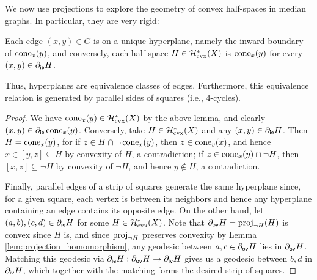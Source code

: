 \documentclass[reqno]{amsart}
\begin{document}
    We now use projections to explore the geometry of convex half-spaces in median graphs. In particular, they are very rigid:

    \begin{proposition}\label{prp:half-spaces_are_cones}
        Each edge $(x,y)\in G$ is on a unique hyperplane, namely the inward boundary of $\operatorname{cone}_x(y)$, and conversely, each half-space $H\in\mathcal{H}^\ast_\mathrm{cvx}(X)$ is $\operatorname{cone}_x(y)$ for every $(x,y)\in\partial_\mathsf{ie}H$.

        Thus, hyperplanes are equivalence classes of edges. Furthermore, this equivalence relation is generated by parallel sides of squares (i.e., $4$-cycles).
    \end{proposition}
    \begin{proof}
        We have $\operatorname{cone}_x(y)\in\mathcal{H}_\mathrm{cvx}^\ast(X)$ by the above lemma, and clearly $(x,y)\in\partial_\mathsf{ie}\operatorname{cone}_x(y)$. Conversely, take $H\in\mathcal{H}_\mathrm{cvx}^\ast(X)$ and any $(x,y)\in\partial_\mathsf{ie}H$. Then $H=\operatorname{cone}_x(y)$, for if $z\in H\cap\lnot\operatorname{cone}_x(y)$, then $z\in\operatorname{cone}_y(x)$, and hence $x\in[y,z]\subseteq H$ by convexity of $H$, a contradiction; if $z\in\operatorname{cone}_x(y)\cap\lnot H$, then $[x,z]\subseteq\lnot H$ by convexity of $\lnot H$, and hence $y\not\in H$, a contradiction.

        Finally, parallel edges of a strip of squares generate the same hyperplane since, for a given square, each vertex is between its neighbors and hence any hyperplane containing an edge contains its opposite edge. On the other hand, let $(a,b),(c,d)\in\partial_\mathsf{ie}H$ for some $H\in\mathcal{H}_\mathrm{cvx}^\ast(X)$. Note that $\partial_\mathsf{ov}H=\operatorname{proj}_{\lnot H}(H)$ is convex since $H$ is, and since $\operatorname{proj}_{\lnot H}$ preserves convexity by Lemma \ref{lem:projection_homomorphism}, any geodesic between $a,c\in\partial_\mathsf{ov}H$ lies in $\partial_\mathsf{ov}H$. Matching this geodesic via $\partial_\mathsf{ie}H:\partial_\mathsf{ov}H\to\partial_\mathsf{iv}H$ gives us a geodesic between $b,d$ in $\partial_\mathsf{iv}H$, which together with the matching forms the desired strip of squares.
    \end{proof}
\end{document}
